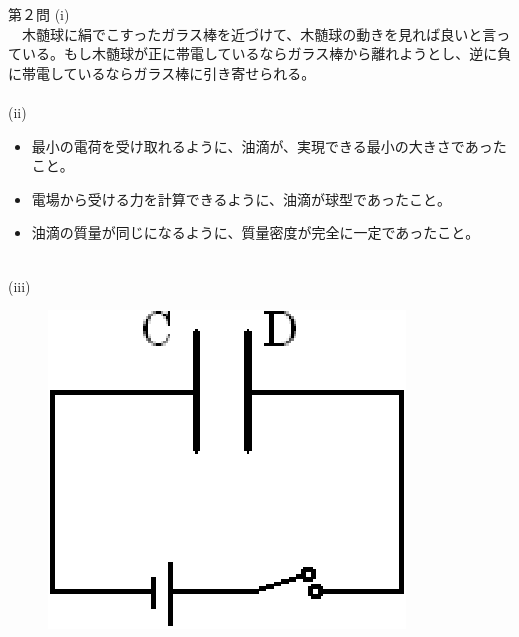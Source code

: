 \documentclass[fleqn]{jbook}
\begin{document}
\begin{answer}{第２問}{}
(i)\\
　木髄球に絹でこすったガラス棒を近づけて、木髄球の動きを見れば良いと言っている。もし木髄球が正に帯電しているならガラス棒から離れようとし、逆に負に帯電しているならガラス棒に引き寄せられる。\\
\\
(ii)
\begin{itemize}
\item 最小の電荷を受け取れるように、油滴が、実現できる最小の大きさであったこと。
\item 電場から受ける力を計算できるように、油滴が球型であったこと。
\item 油滴の質量が同じになるように、質量密度が完全に一定であったこと。
\end{itemize}
　\\
(iii)
\begin{figure}[h]
\vspace*{-\intextsep}
 \begin{center}
  \includegraphics{2004engl2-1.eps}
 \end{center}
\end{figure}
\end{answer}
\end{document}
